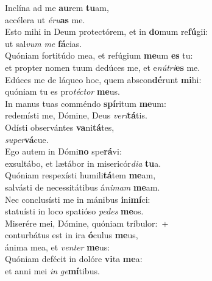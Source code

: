 \evenverse Inclína ad me \textbf{au}rem \textbf{tu}am,~\*\\
\evenverse accélera ut \textit{é}\textit{ru}\textbf{as} me.\\
\oddverse Esto mihi in Deum protectórem, et in \textbf{do}mum re\textbf{fú}gii:~\*\\
\oddverse ut sal\textit{vum} \textit{me} \textbf{fá}cias.\\
\evenverse Quóniam fortitúdo mea, et refúgium \textbf{me}um \textbf{es} tu:~\*\\
\evenverse et propter nomen tuum dedúces me, et e\textit{nú}\textit{tri}\textbf{es} me.\\
\oddverse Edúces me de láqueo hoc, quem abscon\textbf{dé}runt \textbf{mi}hi:~\*\\
\oddverse quóniam tu es pro\textit{té}\textit{ctor} \textbf{me}us.\\
\evenverse In manus tuas comméndo \textbf{spí}ritum \textbf{me}um:~\*\\
\evenverse redemísti me, Dómine, Deus \textit{ve}\textit{ri}\textbf{tá}tis.\\
\oddverse Odísti observántes \textbf{va}ni\textbf{tá}tes,~\*\\
\oddverse \textit{su}\textit{per}\textbf{vá}cue.\\
\evenverse Ego autem in Dómi\textbf{no} spe\textbf{rá}vi:~\*\\
\evenverse exsultábo, et lætábor in misericór\textit{di}\textit{a} \textbf{tu}a.\\
\oddverse Quóniam respexísti humili\textbf{tá}tem \textbf{me}am,~\*\\
\oddverse salvásti de necessitátibus á\textit{ni}\textit{mam} \textbf{me}am.\\
\evenverse Nec conclusísti me in mánibus \textbf{i}ni\textbf{mí}ci:~\*\\
\evenverse statuísti in loco spatióso \textit{pe}\textit{des} \textbf{me}os.\\
\oddverse Miserére mei, Dómine, quóniam tríbulor:~+\\
\oddverse  conturbátus est in ira \textbf{ó}culus \textbf{me}us,~\*\\
\oddverse ánima mea, et \textit{ven}\textit{ter} \textbf{me}us:\\
\evenverse Quóniam defécit in dolóre \textbf{vi}ta \textbf{me}a:~\*\\
\evenverse et anni mei \textit{in} \textit{ge}\textbf{mí}tibus.\\
